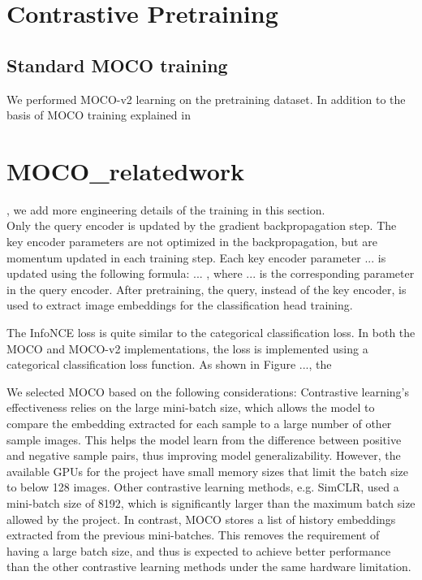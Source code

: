 \documentclass[12pt,twoside]{report}
\begin{document}
\section{Contrastive Pretraining}
\subsection{Standard MOCO training} \label{sec:naiveMOCO}
We performed MOCO-v2 \cite{mocov2} learning on the pretraining dataset. In addition to the basis of MOCO training explained in \section{MOCO_relatedwork}, we add more engineering details of the training in this section. \\

Only the query encoder is updated by the gradient backpropagation step. The key encoder parameters are not optimized in the backpropagation, but are momentum updated in each training step. Each key encoder parameter ... is updated using the following formula: ... , where ... is the corresponding parameter in the query encoder. After pretraining, the query, instead of the key encoder, is used to extract image embeddings for the classification head training. 

The InfoNCE loss is quite similar to the categorical classification loss. In both the MOCO and MOCO-v2 implementations, the loss is implemented using a categorical classification loss function. As shown in Figure ..., the 

We selected MOCO based on the following considerations: Contrastive learning's effectiveness relies on the large mini-batch size, which allows the model to compare the embedding extracted for each sample to a large number of other sample images. This helps the model learn from the difference between positive and negative sample pairs, thus improving model generalizability. However, the available GPUs for the project have small memory sizes that limit the batch size to below 128 images. Other contrastive learning methods, e.g. SimCLR, used a mini-batch size of 8192, which is significantly larger than the maximum batch size allowed by the project. In contrast, MOCO stores a list of history embeddings extracted from the previous mini-batches. This removes the requirement of having a large batch size, and thus is expected to achieve better performance than the other contrastive learning methods under the same hardware limitation.\\
\end{document}
